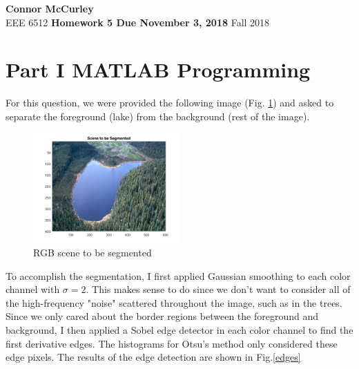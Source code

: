 \documentclass{article}[12 pt]
\begin{document}
	
\begin{center}
	\textbf{\Large Connor McCurley} \\
	EEE 6512 \qquad \textbf{\large Homework 5 Due November 3, 2018} \qquad Fall 2018 
\end{center}

\section*{Part I MATLAB Programming}

For this question, we were provided the following image (Fig. \ref{scene}) and asked to separate the foreground (lake) from the background (rest of the image). 
\begin{center}
	\begin{figure}[H]
		\centering
		\includegraphics[width = 0.5\textwidth]{Images/scene.png}
		\caption{RGB scene to be segmented}
		\label{scene}
	\end{figure}
\end{center}

\noindent
To accomplish the segmentation, I first applied Gaussian smoothing to each color channel with $\sigma=2$.  This makes sense to do since we don't want to consider all of the high-frequency "noise" scattered throughout the image, such as in the trees.  Since we only cared about the border regions between the foreground and background, I then applied a Sobel edge detector in each color channel to find the first derivative edges.  The histograms for Otsu's method only considered these edge pixels. The results of the edge detection are shown in Fig.\ref{edges}
\end{document}
